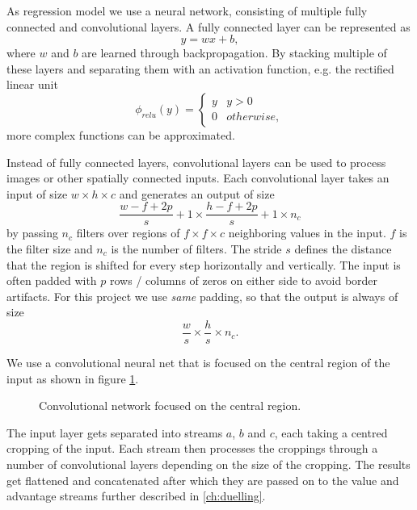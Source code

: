 
As regression model we use a neural network, consisting of multiple fully connected and convolutional layers. A fully connected layer can be represented as
\begin{equation}
y = w x+b,
\end{equation}
where $w$ and $b$ are learned through backpropagation. By stacking multiple of these layers and separating them with an activation function, e.g. the rectified linear unit
\begin{equation}
\phi_{relu}(y) = \begin{cases}
y & y > 0 \\
0 & otherwise,
\end{cases}
\end{equation}
more complex functions can be approximated.

Instead of fully connected layers, convolutional layers can be used to process images or other spatially connected inputs. Each convolutional layer takes an input of size $w\times h \times c$ and generates an output of size $$\frac{w-f+2p}{s}+1 \times \frac{h-f+2p}{s}+1 \times n_c$$ by passing $n_c$ filters over regions of $f\times f \times c$ neighboring values in the input. $f$ is the filter size and $n_c$ is the number of filters. The stride $s$ defines the distance that the region is shifted for every step horizontally and vertically. The input is often padded with $p$ rows / columns of zeros on either side to avoid border artifacts. For this project we use \emph{same} padding, so that the output is always of size $$\frac{w}{s}\times \frac{h}{s} \times n_c.$$

We use a convolutional neural net that is focused on the central region of the input as shown in figure \ref{fig:centre-net}.
\begin{figure}
  \centering
  
  \caption{Convolutional network focused on the central region.}
  \label{fig:centre-net}
\end{figure}
The input layer gets separated into streams $a$, $b$ and $c$, each taking a centred cropping of the input. Each stream then processes the croppings through a number of convolutional layers depending on the size of the cropping. The results get flattened and concatenated after which they are passed on to the value and advantage streams further described in \ref{ch:duelling}.
